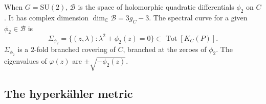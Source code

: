 \documentclass[12pt,letterpaper,reqno]{article}
\numberwithin{equation}{section}
\newcommand{\cB}{\ensuremath{\mathcal B}}
\newcommand{\cM}{\ensuremath{\mathcal M}}
\newcommand{\bbC}{\ensuremath{\mathbb C}}
\newcommand{\bbP}{\ensuremath{\mathbb P}}
\newcommand{\hk}{hyperk\"ahler\xspace}
\newcommand{\sing}{\mathrm{sing}}
\newcommand{\abs}[1]{\lvert#1\rvert}
\newcommand{\vphi}{{\vec\phi}}
\DeclareMathOperator{\Tot}{Tot}
\newcommand{\SU}{\mathrm{SU}}
\newcommand{\insfig}[2]{

\medskip
\noindent
\begin{minipage}{\linewidth}

\makebox[\linewidth]{\texttt{[image: figures/\#1-crop.pdf]}}

\end{minipage}
\medskip

}
\newcommand{\fixme}[1]{{\color{orange}{[#1]}}}
\begin{document}
\begin{example}[Hitchin base and spectral curves for $G = \SU(2)$]
When $G = \SU(2)$, $\cB$ is the space of holomorphic quadratic
differentials $\phi_2$ on $C$.
It has complex dimension
$\dim_\bbC \cB = 3 g_C - 3$. 
The spectral curve for a given $\phi_2 \in \cB$
is
\begin{equation}
  \Sigma_{\phi_2} = \{(z,\lambda): \lambda^2 + \phi_2(z) = 0\} \subset \Tot[K_C(P)].
\end{equation}
$\Sigma_{\phi_2}$ is a $2$-fold branched covering of $C$, branched at the zeroes of $\phi_2$.
The eigenvalues of $\varphi(z)$ are $\pm \sqrt{- \phi_2(z)}$.
\end{example}









\subsection{The \hk metric}
\end{document}
